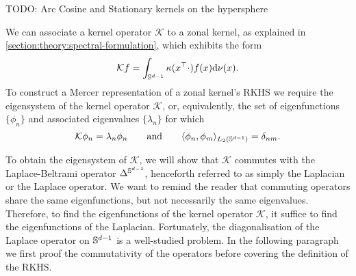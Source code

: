 TODO: Arc Cosine and Stationary kernels on the hypersphere


We can associate a kernel operator $\mathcal{K}$ to a zonal kernel, as explained in \cref{section:theory:spectral-formulation}, which exhibits the form
\begin{equation}
    \label{eq:kernel-operator-zonal}
  \mathcal{K} f = \int_{\mathbb{S}^{d-1}} \kappa(x^{\top}\cdot) f(x) \mathrm{d}{\nu(x)}.
\end{equation}
To construct a Mercer representation of a zonal kernel's RKHS we require the eigensystem of the kernel operator $\mathcal{K}$, or, equivalently, the set of eigenfunctions $\{\phi_n\}$ and associated eigenvalues $\{\lambda_n\}$ for which
\begin{equation}
    \mathcal{K} \phi_n = \lambda_n \phi_n\qquad\text{and}\qquad \langle \phi_n, \phi_m \rangle_{L_2(\mathbb{S}^{d-1})} = \delta_{nm}.
\end{equation}

To obtain the eigensystem of $\mathcal{K}$, we will show that $\mathcal{K}$ commutes with the Laplace-Beltrami operator $\Delta^{\mathbb{S}^{d-1}}$, henceforth referred to as simply the Laplacian or the Laplace operator. We want to remind the reader that commuting operators share the same eigenfunctions, but not necessarily the same eigenvalues. Therefore, to find the eigenfunctions of the kernel operator $\mathcal{K}$, it suffice to find the eigenfunctions of the Laplacian. Fortunately, the diagonalisation of the Laplace operator on $\mathbb{S}^{d-1}$ is a well-studied problem. In the following paragraph we first proof the commutativity of the operators before covering the definition of the RKHS.

